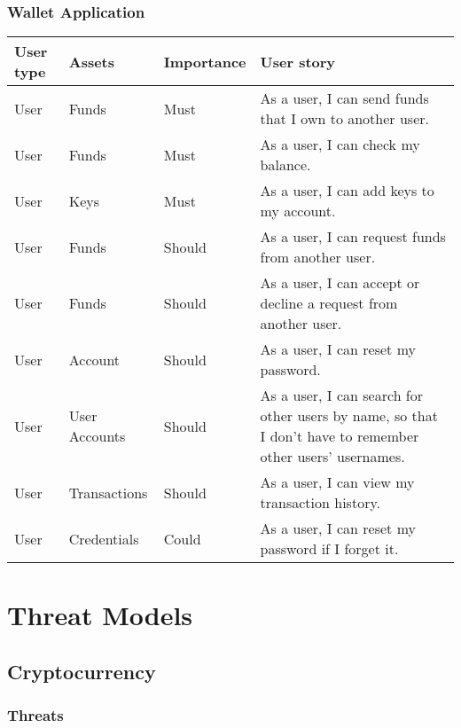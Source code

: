 \documentclass[12pt]{article}
\begin{document}
\subsubsection*{Wallet Application}

\begin{tabularx}{\linewidth}{|l|l|l|X|}
\hline
\textbf{User type} & \textbf{Assets} & \textbf{Importance} & \textbf{User story} \\
\hline
User & Funds & Must & As a user, I can send funds that I own to another user. \\
\hline
User & Funds & Must & As a user, I can check my balance. \\
\hline
User & Keys & Must & As a user, I can add keys to my account. \\
\hline
User & Funds & Should & As a user, I can request funds from another user. \\
\hline
User & Funds & Should & As a user, I can accept or decline a request from another user. \\
\hline
User & Account & Should & As a user, I can reset my password. \\
\hline
User & User Accounts & Should & As a user, I can search for other users by name, so that I don't have to remember other users' usernames. \\
\hline
User & Transactions & Should & As a user, I can view my transaction history. \\
\hline
User & Credentials & Could & As a user, I can reset my password if I forget it. \\
\hline
\end{tabularx}

\section{Threat Models}

\subsection{Cryptocurrency}

\subsubsection*{Threats}
\end{document}
